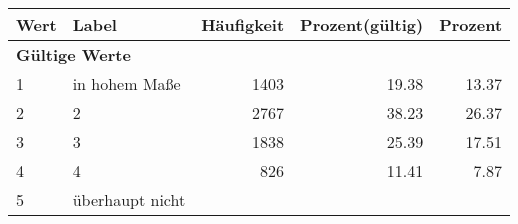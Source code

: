      \begin{longtable}{lXrrr}
     \toprule
     \textbf{Wert} & \textbf{Label} & \textbf{Häufigkeit} & \textbf{Prozent(gültig)} & \textbf{Prozent} \\
     \endhead
     \midrule
     \multicolumn{5}{l}{\textbf{Gültige Werte}}\\

     1 &
     \multicolumn{1}{X}{ in hohem Maße   } &


       \num{1403} &
       \num[round-mode=places,round-precision=2]{19.38} &
         \num[round-mode=places,round-precision=2]{13.37} \\

     2 &
     \multicolumn{1}{X}{ 2   } &


       \num{2767} &
       \num[round-mode=places,round-precision=2]{38.23} &
         \num[round-mode=places,round-precision=2]{26.37} \\

     3 &
     \multicolumn{1}{X}{ 3   } &


       \num{1838} &
       \num[round-mode=places,round-precision=2]{25.39} &
         \num[round-mode=places,round-precision=2]{17.51} \\

     4 &
     \multicolumn{1}{X}{ 4   } &


       \num{826} &
       \num[round-mode=places,round-precision=2]{11.41} &
         \num[round-mode=places,round-precision=2]{7.87} \\

     5 &
     \multicolumn{1}{X}{ überhaupt nicht   } &



\end{longtable}
